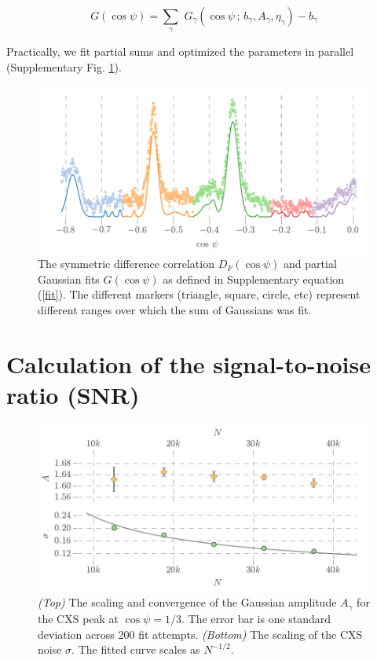 \documentclass [12pt,fleqn]{article}
\def \be {\begin{equation}}
\def \ee {\end{equation}}
\begin{document}
\be \label{fit}
G(\cos \psi) = \sum_\gamma \,\,G_\gamma ( \cos \psi \,;\, b_\gamma, A_\gamma, \eta_\gamma) - b_\gamma
\ee

Practically, we fit partial sums and optimized the parameters in parallel (Supplementary Fig. \ref{fig:gaussian_partial}).

\begin{figure}[H]
\includegraphics[scale=0.8]{supp_figs/gaussian_partial.pdf}
\caption{The symmetric difference correlation $D_F(\cos \psi)$ and partial Gaussian fits $G(\cos \psi)$ as defined in Supplementary equation (\ref{fit}). The different markers (triangle, square, circle, etc) represent different ranges over which the sum of Gaussians was fit.}
\label{fig:gaussian_partial}
\end{figure}

\section{Calculation of the signal-to-noise ratio (SNR)} \label{supp:Z}
\begin{figure}[H]
\includegraphics[]{supp_figs/new_scaling.pdf}
\caption{\emph{(Top)} The scaling and convergence of the Gaussian amplitude $A_\gamma$ for the CXS peak at $\cos \psi = 1/3$. The error bar is one standard deviation across 200 fit attempts. \emph{(Bottom)} The scaling of the CXS noise $\sigma$. The fitted curve scales as $N^{-1/2}$.}
\label{fig:scaling}
\end{figure}
\end{document}
